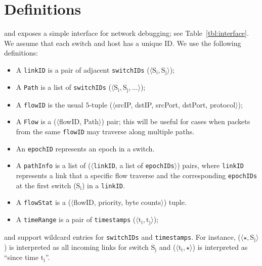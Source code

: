 
\section{Definitions}
\archp and \archs exposes a simple interface for network debugging; see Table~\ref{tbl:interface}. We assume that each switch and host has a unique ID. We use the following definitions:
\begin{center}
\begin{itemize}[leftmargin=*, topsep=.3em, parsep=.2em]
\itemsep0em
  \item A {\tt linkID} is a pair of adjacent {\tt switchIDs} ($\langle \textrm{S}_\textrm{i}, \textrm{S}_\textrm{j} \rangle$);
  \item A {\tt Path} is a list of {\tt switchIDs} ($\langle \textrm{S}_\textrm{i}, \textrm{S}_\textrm{j}, \dots \rangle$);
  \item A {\tt flowID} is the usual $5$-tuple ($\langle$srcIP, dstIP, srcPort, dstPort, protocol$\rangle$);
  \item A {\tt Flow} is a ($\langle$flowID, Path$\rangle$) pair; this will be useful for cases when packets from the same {\tt flowID} may traverse along multiple paths.
  \item An {\tt epochID} represents an epoch in a switch.
  \item A {\tt pathInfo} is a list of ($\langle${\tt linkID}, a list of {\tt epochIDs}$\rangle$) pairs, where {\tt linkID} represents a link that a specific flow traverse and the corresponding {\tt epochIDs} at the first switch ($\textrm{S}_\textrm{i}$) in a {\tt linkID}.
  \item A {\tt flowStat} is a ($\langle$flowID, priority, byte counts$\rangle$) tuple.
  \item A {\tt timeRange} is a pair of {\tt timestamps} ($\langle \textrm{t}_\textrm{i}, \textrm{t}_\textrm{j} \rangle$); 
\end{itemize}
\end{center}
\archp and \archs support wildcard entries for {\tt switchIDs} and {\tt timestamps}. For instance, ($\langle \star, \textrm{S}_\textrm{j} \rangle$) is interpreted as all incoming links for switch $\textrm{S}_\textrm{j}$ and ($\langle \textrm{t}_\textrm{i}, \star \rangle$) is interpreted as ``since time $\textrm{t}_\textrm{i}$''.


